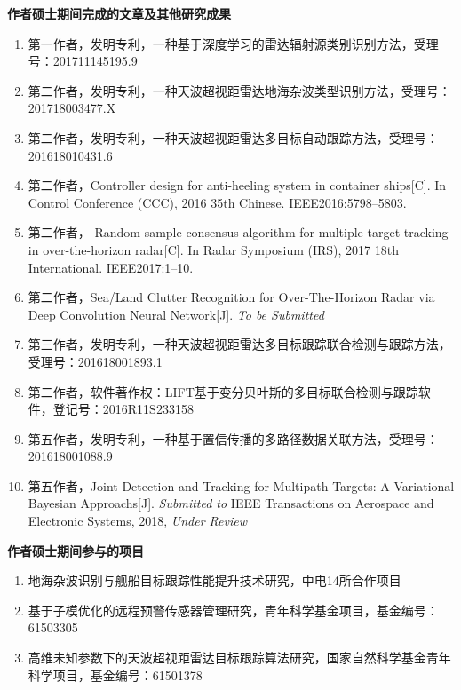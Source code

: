 
\textbf{\Large{作者硕士期间完成的文章及其他研究成果}}
\begin{enumerate}
\item 第一作者，发明专利，一种基于深度学习的雷达辐射源类别识别方法，受理号：201711145195.9

\item 第二作者，发明专利，一种天波超视距雷达地海杂波类型识别方法，受理号：201718003477.X

\item 第二作者，发明专利，一种天波超视距雷达多目标自动跟踪方法，受理号：201618010431.6

\item 第二作者，Controller design for anti-heeling system in container ships[C]. In Control Conference (CCC), 2016 35th Chinese. IEEE2016:5798–5803.

\item 第二作者， Random sample consensus algorithm for multiple target tracking in over-the-horizon radar[C]. In Radar Symposium (IRS), 2017 18th International. IEEE2017:1–10.

\item 第二作者，Sea/Land Clutter Recognition for Over-The-Horizon Radar via Deep Convolution Neural Network[J]. \textit{To be Submitted}

\item 第三作者，发明专利，一种天波超视距雷达多目标跟踪联合检测与跟踪方法，受理号：201618001893.1

\item 第二作者，软件著作权：LIFT\underline{\hspace{0.5em}}基于变分贝叶斯的多目标联合检测与跟踪软件，登记号：2016R11S233158

\item 第五作者，发明专利，一种基于置信传播的多路径数据关联方法，受理号：201618001088.9

\item 第五作者，Joint Detection and Tracking for Multipath Targets: A Variational Bayesian Approachs[J]. \textit{Submitted to } IEEE Transactions on Aerospace and Electronic Systems, 2018, \textit{Under Review}

\end{enumerate}

\textbf{\Large{作者硕士期间参与的项目}}

\begin{enumerate}

\item 地海杂波识别与舰船目标跟踪性能提升技术研究，中电14所合作项目

\item 基于子模优化的远程预警传感器管理研究，青年科学基金项目，基金编号：61503305

\item 高维未知参数下的天波超视距雷达目标跟踪算法研究，国家自然科学基金青年科学项目，基金编号：61501378

\end{enumerate}
